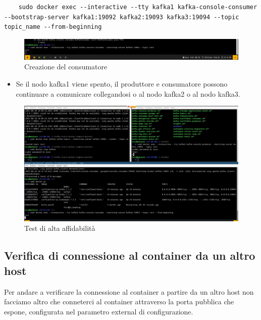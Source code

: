 \documentclass{article}
\begin{document}
\begin{lstlisting}
    sudo docker exec --interactive --tty kafka1 kafka-console-consumer --bootstrap-server kafka1:19092 kafka2:19093 kafka3:19094 --topic topic_name --from-beginning
\end{lstlisting}
\begin{figure}[H]
    \centering
    \includegraphics[scale=0.5]{images/consumatore.png}
    \caption{Creazione del consumatore}
    \label{fig:my_label}
\end{figure}
\begin{itemize}
    \item Se il nodo kafka1 viene spento, il produttore e consumatore possono continuare a comunicare collegandosi o al nodo kafka2 o al nodo kafka3.
\end{itemize}
\begin{figure}[H]
    \centering
    \includegraphics[scale=0.5]{images/test_di_high_avaibility.png}
    \caption{Test di alta affidabilità}
    \label{fig:my_label}
\end{figure}
\subsection{Verifica di connessione al container da un altro host}
Per andare a verificare la connessione al container a partire da un altro host non facciamo altro che conneterci al container attraverso la porta pubblica che espone, configurata nel parametro external di configurazione.
\end{document}
